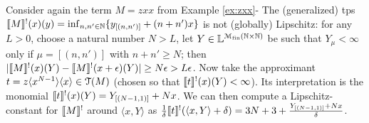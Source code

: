 \begin{example}
Consider again the term $M=zxx$ from Example \ref{ex:zxx}-
%
 The (generalized) tps $\llbracket M\rrbracket^{!}(x)(y)= \inf_{n,n'\in \mathbb N}\{y_{[(n,n')]}+(n+n')x\}$ is not (globally) Lipschitz: for any 
$L>0$, choose a natural number $N>L$, let $Y\in \mathbb{L}^{\mathcal M_{\mathrm{fin}}(\mathbb N\times \mathbb N)}$ be such that $Y_{\mu}<\infty$ only if $\mu=[(n,n')]$ with $n+n'\geq N$; then $|\llbracket M\rrbracket^{!}(x)(Y)- \llbracket M\rrbracket^{!}(x+\epsilon)(Y)|\geq N\epsilon > L\epsilon$. 
Now take the approximant $t= z \langle x^{N-1}\rangle \langle x\rangle \in \mathcal{T}(M)$ (chosen so that $\llbracket t\rrbracket^{!}(x)(Y)<\infty$). Its interpretation is the monomial 
$\llbracket t\rrbracket^{!}(x)(Y) = Y_{[(N-1,1)]}+Nx$. We can then compute a Lipschitz-constant for $\llbracket M\rrbracket^{!}$ around $\langle x,Y\rangle$
as $\frac{1}{\delta}\llbracket t\rrbracket^{!}(\langle x,Y\rangle+\delta)= 3N+3 + \frac{Y_{[(N-1,1)]}+Nx}{\delta}$. 
\end{example}
%    
%
%

